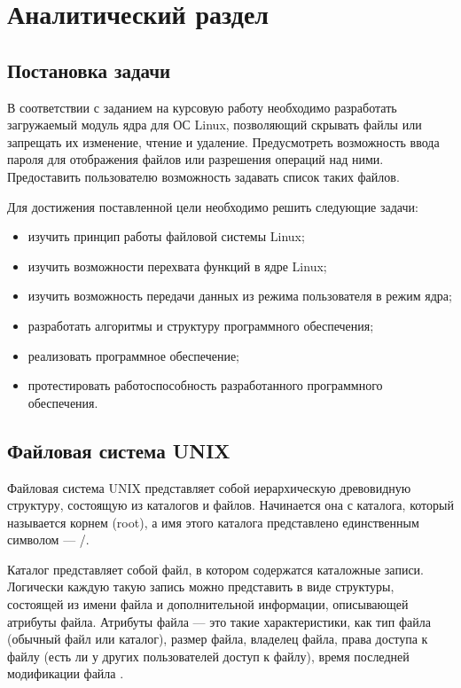 \chapter{Аналитический раздел}
\label{cha:analysis}

\section{Постановка задачи}

В соответствии с заданием на курсовую работу необходимо разработать загружаемый модуль ядра для ОС Linux, позволяющий скрывать файлы или запрещать их изменение, чтение и удаление. Предусмотреть возможность ввода пароля для отображения файлов или разрешения операций над ними. Предоставить пользователю возможность задавать список таких файлов.

Для достижения поставленной цели необходимо решить следующие задачи:

\begin{itemize}
	\item изучить принцип работы файловой системы Linux;
	\item изучить возможности перехвата функций в ядре Linux;
	\item изучить возможность передачи данных из режима пользователя в режим ядра;
	\item разработать алгоритмы и структуру программного обеспечения;
	\item реализовать программное обеспечение;
	\item протестировать работоспособность разработанного программного обеспечения.
\end{itemize}

\section{Файловая система UNIX}

Файловая система UNIX представляет собой иерархическую древовидную структуру, состоящую из каталогов и файлов. Начинается она с каталога, который называется корнем (root), а имя этого каталога представлено единственным символом --- /.

Каталог представляет собой файл, в котором содержатся каталожные записи. Логически каждую такую запись можно представить в виде структуры, состоящей из имени файла и дополнительной информации, описывающей атрибуты файла. Атрибуты файла --- это такие характеристики, как тип файла (обычный файл или каталог), размер файла, владелец файла, права доступа к файлу (есть ли у других пользователей доступ к файлу), время последней модификации файла \cite{stiven}.

